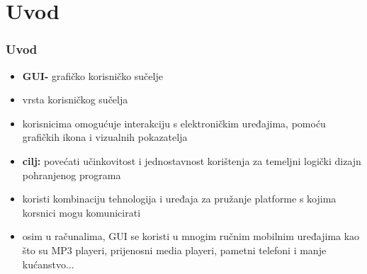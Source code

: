 \section{Uvod}
\begin{frame}[allowframebreaks]
\frametitle{Uvod}
\begin{itemize}
\item \textbf{GUI-} grafičko korisničko sučelje
\item vrsta korisničkog sučelja
\item korisnicima omogućuje interakciju s elektroničkim uređajima, pomoću grafičkih ikona i vizualnih pokazatelja
\item \textbf{cilj:} povećati učinkovitost i jednostavnost korištenja za temeljni logički dizajn pohranjenog programa
\item koristi kombinaciju tehnologija i uređaja za pružanje platforme s kojima korsnici mogu komunicirati
\item osim u računalima, GUI se koristi u mnogim ručnim mobilnim uređajima kao što su MP3 playeri, prijenosni media playeri, pametni telefoni i manje kućanstvo...
\end{itemize}
\end{frame}